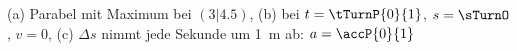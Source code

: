 (a) Parabel mit Maximum bei $(3|4.5)$, (b) bei $t = \tTurnP{0}{1}$, $s = \sTurnO$, $v = 0$, (c) $\Delta s$ nimmt jede Sekunde um \SI{1}{\meter} ab: $a = \accP{0}{1}$

